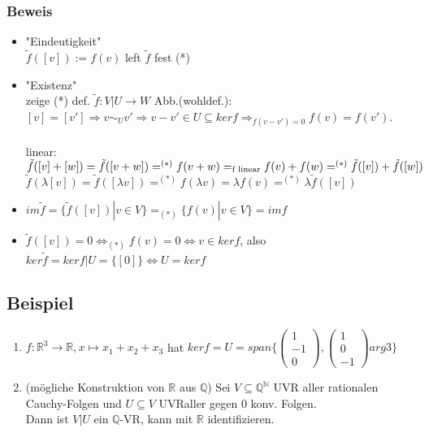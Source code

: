 \documentclass[a4paper, 12pt]{extarticle}
\newcommand{\vecThree}[3] {
	\left( 
	\begin{matrix}
		#1\\
		#2\\
		#3
	\end{matrix} 
	\right)
}
\newcommand{\gdw}{\Leftrightarrow}
\newcommand{\tn}[1]{\textnormal {#1}}
\begin{document}
\subsubsection*{Beweis}
\begin{itemize}
	\item "Eindeutigkeit" \\
	$\tilde f([v]) := f(v)$ left $\tilde f$ fest (*)
	\item "Existenz" \\
	zeige (*) def. $\tilde f:V|U\to W$ Abb.(wohldef.): \\
	$[v] =[v'] \Rightarrow v\sim_U v' \Rightarrow v-v'\in U \subseteq kerf \Rightarrow_{f(v-v')=0} f(v) = f(v')$. \\ \\
	linear:$\tilde f ([v] + [w]) = \tilde f ([v+w]) =^{(*)} f(v+w) = _{\tn{f linear}} f(v) + f(w) =^{(*)} \tilde f([v]) + \tilde f([w])$ \\
	$\tilde f(\lambda [v]) = \tilde f([\lambda v]) =^{(*)} f(\lambda v) = \lambda f(v) =^{(*)} \lambda \tilde f([v])$
	\item
	$im\tilde f = \{\tilde f([v]) | v\in V\} =_{(*)} \{f(v) | v\in V\} = imf$
	\item 
	$\tilde f([v]) = 0 \gdw_{(*)} f(v) = 0 \gdw v\in kerf$, also $ker \tilde f = ker f|U = \{[0]\} \gdw U = kerf$
\end{itemize}
\subsection*{Beispiel}
\begin{enumerate}[label=\arabic*)]
	\item $f:\mathbb R^3\to \mathbb R, x\mapsto x_1+x_2+x_3$ hat $kerf = U = span\{\vecThree{1}{-1}{0}, \vecThree{1}0{-1}{arg3}\}$
	\item (mögliche Konstruktion von $\mathbb R$ aus $\mathbb Q$) Sei $V\subseteq \mathbb Q^\mathbb N$ UVR aller rationalen Cauchy-Folgen und $U\subseteq V$ UVRaller gegen 0 konv. Folgen.\\
	Dann ist $V|U$ ein $\mathbb Q$-VR, kann mit $\mathbb R$ identifizieren.
\end{enumerate}
\end{document}
